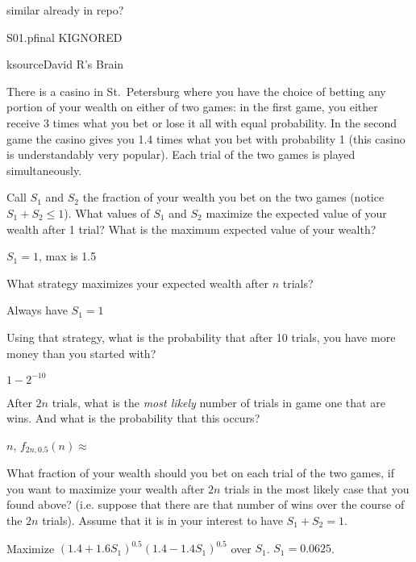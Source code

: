 \begin{problem}
\begin{staffnotes}
similar already in repo?

S01.pfinal KIGNORED

ksource{David R's Brain}
\end{staffnotes}

There is a casino in St.\ Petersburg where you have the choice of
betting any portion of your wealth on either of two games: in the
first game, you either receive 3 times what you bet or lose it all
with equal probability.  In the second game the casino gives you 1.4
times what you bet with probability 1 (this casino is understandably
very popular).  Each trial of the two games is played simultaneously.

\bparts

\ppart Call $S_1$ and $S_2$ the fraction of your wealth you bet
on the two games (notice $S_1+S_2\leq 1$).  What values of $S_1$ and
$S_2$ maximize the expected value of your wealth after 1 trial?  What
is the maximum expected value of your wealth?
\begin{solution}
$S_1=1$, max is 1.5
\end{solution}

\ppart What strategy maximizes your expected wealth after $n$
trials? 
\begin{solution}
Always have $S_1=1$
\end{solution}

\ppart Using that strategy, what is the probability that after
10 trials, you have more money than you started with? 
\begin{solution}
$1-2^{-10}$
\end{solution}

\examspace
\ppart After $2n$ trials, what is the {\em most likely} number
of trials in game one that are wins.  And what is the probability that
this occurs?

\begin{solution}
$n$, $f_{2n,0.5}(n)\approx $
\end{solution}

\ppart What fraction of your wealth should you bet on each
trial of the two games, if you want to maximize your wealth after $2n$
trials in the most likely case that you found above? (i.e. suppose
that there are that number of wins over the course of the $2n$
trials).  Assume that it is in your interest to have $S_1+S_2=1$.
\begin{solution}
Maximize $(1.4+1.6S_1)^{0.5}(1.4-1.4S_1)^{0.5}$ over $S_1$.  $S_1=0.0625$.
\end{solution}
\eparts
\end{problem}

